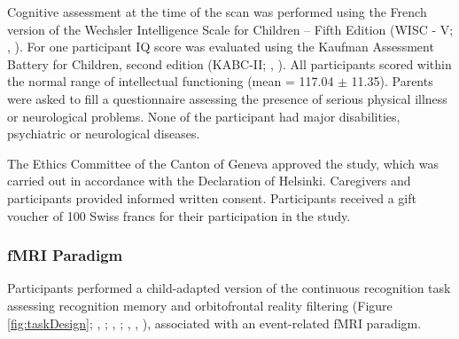 Cognitive assessment at the time of the scan was performed using the French version of the Wechsler Intelligence Scale for Children – Fifth Edition (WISC - V; \citeauthor{Wechsler2014}, \citeyear{Wechsler2014}). For one participant IQ score was evaluated using the Kaufman Assessment Battery for Children, second edition (KABC-II; \citeauthor{Kaufman2004}, \citeyear{Kaufman2004}). All participants scored within the normal range of intellectual functioning (mean = 117.04 $\pm$ 11.35). Parents were asked to fill a questionnaire assessing the presence of serious physical illness or neurological problems. None of the participant had major disabilities, psychiatric or neurological diseases.

The Ethics Committee of the Canton of Geneva approved the study, which was carried out in accordance with the Declaration of Helsinki. Caregivers and participants provided informed written consent. Participants received a gift voucher of 100 Swiss francs for their participation in the study. 

\subsubsection{fMRI Paradigm} \label{subsection:OFC_paradigm}
Participants performed a child-adapted version of the continuous recognition task assessing recognition memory and orbitofrontal reality filtering (Figure \ref{fig:taskDesign}; \citeauthor{Liverani2017}, \citeyear{Liverani2017}; \citeauthor{Schnider1996}, \citeyear{Schnider1996}; \citeauthor{Schnider2003}, \citeyear{Schnider2003}, \citeyear{Schnider2013}), associated with an event-related fMRI paradigm.


